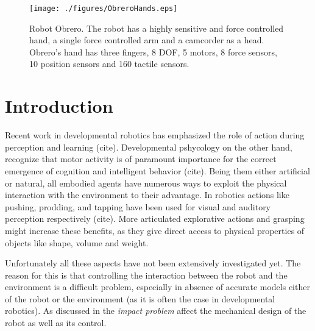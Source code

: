 \begin{figure}[tbp]
\centerline{
\texttt{[image: ./figures/ObreroHands.eps]}
} \caption{Robot Obrero. The robot has a highly sensitive and
force controlled hand, a single force controlled arm and a
camcorder as a head. Obrero's hand  has three fingers, 8 DOF, 5
motors, 8 force sensors, 10 position sensors and 160 tactile
sensors.} \label{fig:RobotObrero}
\end{figure}

\section{Introduction}

Recent work in developmental robotics has emphasized the role of
action during perception and learning (cite). Developmental
pshycology on the other hand, recognize that motor activity is of
paramount importance for the correct emergence of cognition and
intelligent behavior (cite). Being them either artificial or
natural, all embodied agents have numerous ways to exploit the
physical interaction with the environment to their advantage. In
robotics actions like pushing, prodding, and tapping have been
used for visual and auditory perception respectively
(cite)\cite{etorresjara05tapping}. More articulated explorative
actions and grasping might increase these benefits, as they give
direct access to physical properties of objects like shape, volume
and weight.


Unfortunately all these aspects have not been extensively investigated yet. The
reason for this is that controlling the interaction between the robot and
the environment is a difficult problem, especially in absence of accurate
models either of the robot or the environment (as it is often the case in
developmental robotics). As discussed in \cite{volpe90real} the
\emph{impact problem} affect the mechanical design of the robot as well as
its control.


